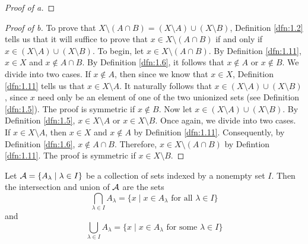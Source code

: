 \documentclass[../main.tex]{subfiles}
\begin{document}
\begin{theorem}
\begin{proof}[Proof of a]
    \end{proof}
    \begin{proof}[Proof of b]
        To prove that $X\setminus(A\cap B)=(X\setminus A)\cup(X\setminus B)$, Definition \ref{dfn:1.2} tells us that it will suffice to prove that $x\in X\setminus(A\cap B)$ if and only if $x\in (X\setminus A)\cup(X\setminus B)$. To begin, let $x\in X\setminus(A\cap B)$. By Definition \ref{dfn:1.11}, $x\in X$ and $x\notin A\cap B$. By Definition \ref{dfn:1.6}, it follows that $x\notin A$ or $x\notin B$. We divide into two cases. If $x\notin A$, then since we know that $x\in X$, Definition \ref{dfn:1.11} tells us that $x\in X\setminus A$. It naturally follows that $x\in(X\setminus A)\cup(X\setminus B)$, since $x$ need only be an element of one of the two unionized sets (see Definition \ref{dfn:1.5}). The proof is symmetric if $x\notin B$. Now let $x\in(X\setminus A)\cup(X\setminus B)$. By Definition \ref{dfn:1.5}, $x\in X\setminus A$ or $x\in X\setminus B$. Once again, we divide into two cases. If $x\in X\setminus A$, then $x\in X$ and $x\notin A$ by Definition \ref{dfn:1.11}. Consequently, by Definition \ref{dfn:1.6}, $x\notin A\cap B$. Therefore, $x\in X\setminus(A\cap B)$ by Defintion \ref{dfn:1.11}. The proof is symmetric if $x\in X\setminus B$.
    \end{proof}
\end{theorem}

\begin{definition}\label{dfn:1.13}
    Let $\mathcal{A}=\{A_\lambda\mid\lambda\in I\}$ be a collection of sets indexed by a nonempty set $I$. Then the intersection and union of $\mathcal{A}$ are the sets
    \begin{equation*}
        \bigcap_{\lambda\in I}A_\lambda = \{x\mid x\in A_\lambda\text{ for all }\lambda\in I\}
    \end{equation*}
    and
    \begin{equation*}
        \bigcup_{\lambda\in I}A_\lambda = \{x\mid x\in A_\lambda\text{ for some }\lambda\in I\}
    \end{equation*}
\end{definition}
\end{document}
